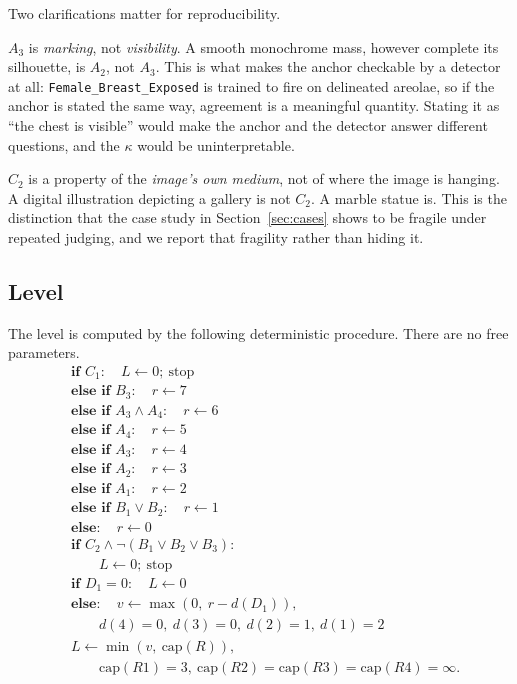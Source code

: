 \documentclass[11pt]{article}
\begin{document}
Two clarifications matter for reproducibility.

$A_3$ is \emph{marking}, not \emph{visibility}. A smooth monochrome mass, however complete its silhouette, is $A_2$, not $A_3$. This is what makes the anchor checkable by a detector at all: \texttt{Female\_Breast\_Exposed} is trained to fire on delineated areolae, so if the anchor is stated the same way, agreement is a meaningful quantity. Stating it as ``the chest is visible'' would make the anchor and the detector answer different questions, and the $\kappa$ would be uninterpretable.

$C_2$ is a property of the \emph{image's own medium}, not of where the image is hanging. A digital illustration depicting a gallery is not $C_2$. A marble statue is. This is the distinction that the case study in Section~\ref{sec:cases} shows to be fragile under repeated judging, and we report that fragility rather than hiding it.

\subsection{Level}
The level is computed by the following deterministic procedure. There are no free parameters.
\begin{equation}
\label{eq:rule}
\begin{aligned}
&\textbf{if } C_1: \quad L \leftarrow 0; \ \text{stop} \\
&\textbf{else if } B_3: \quad r \leftarrow 7 \\
&\textbf{else if } A_3 \wedge A_4: \quad r \leftarrow 6 \\
&\textbf{else if } A_4: \quad r \leftarrow 5 \\
&\textbf{else if } A_3: \quad r \leftarrow 4 \\
&\textbf{else if } A_2: \quad r \leftarrow 3 \\
&\textbf{else if } A_1: \quad r \leftarrow 2 \\
&\textbf{else if } B_1 \vee B_2: \quad r \leftarrow 1 \\
&\textbf{else}: \quad r \leftarrow 0 \\
&\textbf{if } C_2 \wedge \neg(B_1 \vee B_2 \vee B_3): \\
&\qquad L \leftarrow 0; \ \text{stop} \\
&\textbf{if } D_1 = 0: \quad L \leftarrow 0 \\
&\textbf{else}: \quad v \leftarrow \max(0,\ r - d(D_1)), \\
&\qquad d(4)=0,\ d(3)=0,\ d(2)=1,\ d(1)=2 \\
&L \leftarrow \min(v,\ \mathrm{cap}(R)), \\
&\qquad \mathrm{cap}(R1)=3,\ \mathrm{cap}(R2)=\mathrm{cap}(R3)=\mathrm{cap}(R4)=\infty.
\end{aligned}
\end{equation}
\end{document}
